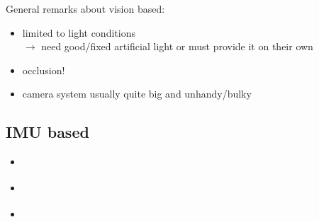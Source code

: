 General remarks about vision based:\\
\begin{itemize}
\item limited to light conditions\\
$\rightarrow$ need good/fixed artificial light or must provide it on their own
\item occlusion!
\item camera system usually quite big and unhandy/bulky
\end{itemize}

\subsection{IMU based}
\begin{itemize}
\item \cite{kortier2014assessment}
\item \cite{kortier2012ambulatory}
\item \cite{fang2014novel}
\end{itemize}


